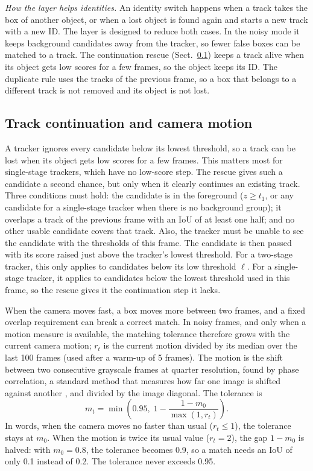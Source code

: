 \emph{How the layer helps identities.} An identity switch happens when a track
takes the box of another object, or when a lost object is found again and
starts a new track with a new ID. The layer is designed to reduce both cases.
In the noisy mode it keeps background candidates away from the tracker, so
fewer false boxes can be matched to a track. The continuation rescue
(Sect.~\ref{sec:rescue}) keeps a track alive when its object gets low scores
for a few frames, so the object keeps its ID. The duplicate rule uses the
tracks of the previous frame, so a box that belongs to a different track is
not removed and its object is not lost.

\subsection{Track continuation and camera motion}\label{sec:rescue}
A tracker ignores every candidate below its lowest threshold, so a track can
be lost when its object gets low scores for a few frames. This matters most
for single-stage trackers, which have no low-score step. The rescue gives
such a candidate a second chance, but only when it clearly continues an
existing track. Three conditions must hold: the candidate is in the
foreground ($z\ge t_1$, or any candidate for a single-stage tracker when
there is no background group); it overlaps a track of the previous frame
with an IoU of at least one half; and no other usable candidate covers that
track. Also, the tracker must be unable to see the candidate with the
thresholds of this frame. The candidate is then passed with its score raised
just above the tracker's lowest threshold. For a two-stage tracker, this only
applies to candidates below its low threshold $\ell$. For a single-stage
tracker, it applies to candidates below the lowest threshold used in this
frame, so the rescue gives it the continuation step it lacks.

When the camera moves fast, a box moves more between two frames, and a fixed
overlap requirement can break a correct match. In noisy frames, and only when
a motion measure is available, the matching tolerance therefore grows with
the current camera motion; $r_t$ is the current motion divided by its median
over the last 100 frames (used after a warm-up of 5 frames). The motion is the shift between two consecutive grayscale
frames at quarter resolution, found by phase correlation, a standard method
that measures how far one image is shifted against another
\cite{reddy1996phasecorr}, and divided by the image diagonal. The tolerance is
\begin{equation}
m_t=\min\!\left(0.95,\;1-\frac{1-m_0}{\max(1,r_t)}\right).
\label{eq:motion}
\end{equation}
In words, when the camera moves no faster than usual ($r_t\le1$), the
tolerance stays at $m_0$. When the motion is twice its usual value
($r_t=2$), the gap $1-m_0$ is halved: with $m_0=0.8$, the tolerance becomes
0.9, so a match needs an IoU of only 0.1 instead of 0.2. The tolerance never
exceeds 0.95.

